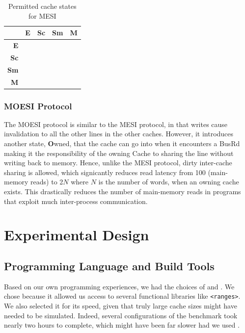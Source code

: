 \documentclass[date,tikzlibs,lmodern,10pt]{epreport}
\newcommand{\cmark}{\ding{51}}%
\newcommand{\xmark}{\ding{55}}%
\begin{document}
\begin{table}[htbp]
	\centering\begin{tabular}{r|cccc}
		            & \textbf{E}                  & \textbf{Sc}                 & \textbf{Sm}                 & \textbf{M}                  \\ \hline
		\textbf{E}  & \textcolor{red}{\xmark{}}   & \textcolor{red}{\xmark{}}   & \textcolor{red}{\xmark{}}   & \textcolor{green}{\xmark{}} \\
		\textbf{Sc} & \textcolor{red}{\xmark{}}   & \textcolor{red}{\cmark{}}   & \textcolor{red}{\cmark{}}   & \textcolor{green}{\xmark{}} \\
		\textbf{Sm} & \textcolor{red}{\xmark{}}   & \textcolor{red}{\cmark{}}   & \textcolor{green}{\xmark{}} & \textcolor{green}{\xmark{}} \\
		\textbf{M}  & \textcolor{green}{\xmark{}} & \textcolor{green}{\xmark{}} & \textcolor{green}{\xmark{}} & \textcolor{green}{\xmark{}}
	\end{tabular}
	\caption{Permitted cache states for MESI}
	\label{tab:dragon-table}
\end{table}

\subsubsection{MOESI Protocol}
The MOESI protocol is similar to the MESI protocol, in that writes cause invalidation to all the other lines in the other
caches.
However, it introduces another state, \textbf{O}wned, that the cache can go into when it encounters a BusRd making it the responsibility
of the owning Cache to sharing the line without writing back to memory.
Hence, unlike the MESI protocol, dirty inter-cache sharing is allowed, which signicantly reduces read latency from 100 (main-memory reads) to 2\(N\) where \(N\) is the number of words, when an owning cache exists.
This drastically reduces the number of main-memory reads in programs that exploit much inter-process communication.
\section{Experimental Design}
\subsection{Programming Language and Build Tools}
Based on our own programming experiences, we had the choices of \Cpp{} and \Cs{}. We chose  because it allowed us access to several functional libraries like \texttt{<ranges>}.
We also selected it for its speed, given that truly large cache sizes might have needed to be simulated.
Indeed, several configurations of the benchmark took nearly two hours to complete, which might have been far slower had we used \Cs{}.
\end{document}
